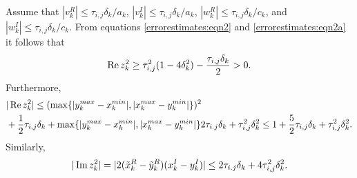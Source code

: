 \documentclass[11pt,final]{amsart}       %
\begin{document}
Assume that $|v^R_k|\leq \tau_{i,j} \delta_{k} / a_{k}$, $|v^I_k|\leq
\tau_{i,j} \delta_{k}/a_{k}$, $|w^R_k|\leq \tau_{i,j} \delta_{k} /
c_{k}$, and $|w^I_k|\leq \tau_{i,j} \delta_{k} / c_{k}$. From
equations \eqref{errorestimates:eqn2} and \eqref{errorestimates:eqn2a}
it follows that
\begin{equation}
\mathop{\text{\rm Re}} z^2_k \geq \tau_{i,j}^2 (1 - 4 \delta_{k}^2) - \frac{\tau_{i,j}
  \delta_{k}}{2} > 0.
\label{errorestimates:eqn3}
\end{equation}
Furthermore,
\begin{equation}
\begin{split}
  &
  |\mathop{\text{\rm Re}} z^2_k| \leq 
(\max\{|y^{max}_k - x^{min}_{k}|,|x^{max}_k - y^{min}_{k}|\})^2
\\
&+ \frac{1}{2}\tau_{i,j} \delta_{k} 
+ 
\max\{|y^{max}_k - x^{min}_{k}|,|x^{max}_k - y^{min}_{k}|\} 
2\tau_{i.j} \delta_{k}
+ \tau^2_{i,j} \delta_{k}^2 
\leq
1 + \frac{5}{2}\tau_{i,j} \delta_{k} + \tau^2_{i,j} \delta_{k}^2. 
\end{split}
\label{errorestimates:eqn6}
\end{equation}
Similarly,
\begin{equation}
  |\mathop{\text{\rm Im}} z^2_k| = |2(\tilde x^R_k - \tilde y^R_k)(x^I_k - y^I_k)|
  \leq
2 \tau_{i.j} \delta_{k} + 4 \tau^2_{i,j} \delta_{k}^2.
\label{errorestimates:eqn4}
\end{equation}
\end{document}
